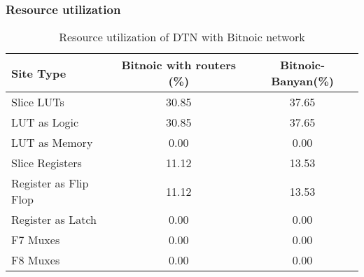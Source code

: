 \begin{frame}[shrink=20]
\frametitle{Resource utilization}

\begin{table}
  \begin{tabular}{l | c | c }
     \textbf{Site Type}  & \textbf{Bitnoic with routers (\%)} & \textbf{Bitnoic-Banyan(\%)} \\
    \hline \hline
    Slice LUTs 			& 30.85 & 37.65 \\ 
    \quad LUT as Logic		& 30.85 & 37.65 \\
    \quad LUT as Memory		& 0.00 & 0.00 	\\
    Slice Registers 		& 11.12	& 13.53 \\
    \quad Register as Flip Flop	& 11.12	& 13.53	\\
    \quad Register as Latch	& 0.00	& 0.00	\\
    F7 Muxes			& 0.00	& 0.00	\\
    F8 Muxes 			& 0.00	& 0.00	\\
  \end{tabular}
  \caption{Resource utilization of DTN with Bitnoic network}
\end{table}

\end{frame}